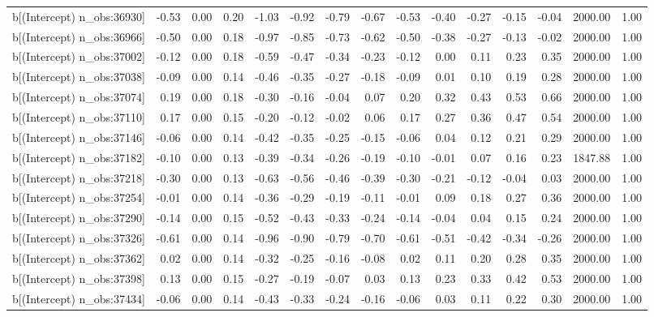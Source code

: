 \begin{table}[ht]
\begin{tabular}{rrrrrrrrrrrrrrr}
  b[(Intercept) n\_obs:36930] & -0.53 & 0.00 & 0.20 & -1.03 & -0.92 & -0.79 & -0.67 & -0.53 & -0.40 & -0.27 & -0.15 & -0.04 & 2000.00 & 1.00 \\ 
  b[(Intercept) n\_obs:36966] & -0.50 & 0.00 & 0.18 & -0.97 & -0.85 & -0.73 & -0.62 & -0.50 & -0.38 & -0.27 & -0.13 & -0.02 & 2000.00 & 1.00 \\ 
  b[(Intercept) n\_obs:37002] & -0.12 & 0.00 & 0.18 & -0.59 & -0.47 & -0.34 & -0.23 & -0.12 & 0.00 & 0.11 & 0.23 & 0.35 & 2000.00 & 1.00 \\ 
  b[(Intercept) n\_obs:37038] & -0.09 & 0.00 & 0.14 & -0.46 & -0.35 & -0.27 & -0.18 & -0.09 & 0.01 & 0.10 & 0.19 & 0.28 & 2000.00 & 1.00 \\ 
  b[(Intercept) n\_obs:37074] & 0.19 & 0.00 & 0.18 & -0.30 & -0.16 & -0.04 & 0.07 & 0.20 & 0.32 & 0.43 & 0.53 & 0.66 & 2000.00 & 1.00 \\ 
  b[(Intercept) n\_obs:37110] & 0.17 & 0.00 & 0.15 & -0.20 & -0.12 & -0.02 & 0.06 & 0.17 & 0.27 & 0.36 & 0.47 & 0.54 & 2000.00 & 1.00 \\ 
  b[(Intercept) n\_obs:37146] & -0.06 & 0.00 & 0.14 & -0.42 & -0.35 & -0.25 & -0.15 & -0.06 & 0.04 & 0.12 & 0.21 & 0.29 & 2000.00 & 1.00 \\ 
  b[(Intercept) n\_obs:37182] & -0.10 & 0.00 & 0.13 & -0.39 & -0.34 & -0.26 & -0.19 & -0.10 & -0.01 & 0.07 & 0.16 & 0.23 & 1847.88 & 1.00 \\ 
  b[(Intercept) n\_obs:37218] & -0.30 & 0.00 & 0.13 & -0.63 & -0.56 & -0.46 & -0.39 & -0.30 & -0.21 & -0.12 & -0.04 & 0.03 & 2000.00 & 1.00 \\ 
  b[(Intercept) n\_obs:37254] & -0.01 & 0.00 & 0.14 & -0.36 & -0.29 & -0.19 & -0.11 & -0.01 & 0.09 & 0.18 & 0.27 & 0.36 & 2000.00 & 1.00 \\ 
  b[(Intercept) n\_obs:37290] & -0.14 & 0.00 & 0.15 & -0.52 & -0.43 & -0.33 & -0.24 & -0.14 & -0.04 & 0.04 & 0.15 & 0.24 & 2000.00 & 1.00 \\ 
  b[(Intercept) n\_obs:37326] & -0.61 & 0.00 & 0.14 & -0.96 & -0.90 & -0.79 & -0.70 & -0.61 & -0.51 & -0.42 & -0.34 & -0.26 & 2000.00 & 1.00 \\ 
  b[(Intercept) n\_obs:37362] & 0.02 & 0.00 & 0.14 & -0.32 & -0.25 & -0.16 & -0.08 & 0.02 & 0.11 & 0.20 & 0.28 & 0.35 & 2000.00 & 1.00 \\ 
  b[(Intercept) n\_obs:37398] & 0.13 & 0.00 & 0.15 & -0.27 & -0.19 & -0.07 & 0.03 & 0.13 & 0.23 & 0.33 & 0.42 & 0.53 & 2000.00 & 1.00 \\ 
  b[(Intercept) n\_obs:37434] & -0.06 & 0.00 & 0.14 & -0.43 & -0.33 & -0.24 & -0.16 & -0.06 & 0.03 & 0.11 & 0.22 & 0.30 & 2000.00 & 1.00 \\ 

\end{tabular}
\end{table}
